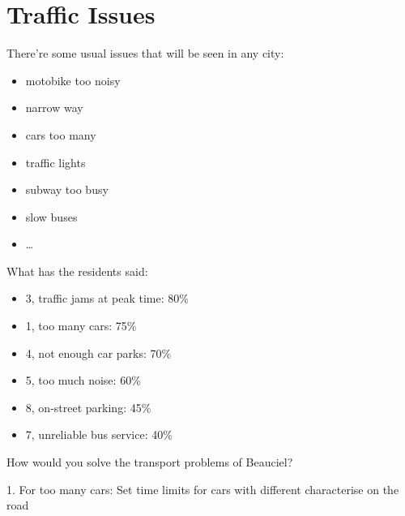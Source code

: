 \section{Traffic Issues}%
\label{sec:Traffic Issues}
There're some usual issues that will be seen in any city:
\begin{itemize}
    \item motobike too noisy
    \item narrow way
    \item cars too many
    \item traffic lights
    \item subway too busy
    \item slow buses
    \item \ldots 
    
\end{itemize}
\begin{notation}
    What has the residents said:
    \begin{itemize}
        \item 3, traffic jams at peak time: 80\%
        \item 1, too many cars: 75\%
        \item 4, not enough car parks: 70\%
        \item 5, too much noise: 60\%
        \item 8, on-street parking: 45\%
        \item 7, unreliable bus service: 40\%
    \end{itemize}
\end{notation}
\begin{question}
    How would you solve the transport problems of Beauciel?
\end{question}
\begin{sol}
    1. For too many cars: Set time limits for cars with different characterise on the road
\end{sol}
